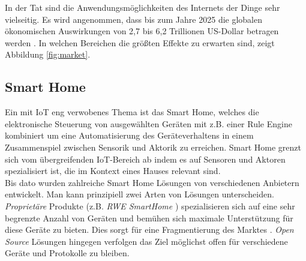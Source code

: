 In der Tat sind die Anwendungsmöglichkeiten des Internets der Dinge sehr vielseitig. Es wird angenommen, dass bis zum Jahre 2025 die globalen ökonomischen Auswirkungen von 2,7 bis 6,2 Trillionen US-Dollar betragen werden \cite{money}. In welchen Bereichen die größten Effekte zu erwarten sind, zeigt Abbildung \ref{fig:market}.





\subsection{Smart Home}
Ein mit IoT eng verwobenes Thema ist das Smart Home\cite{SmartHomeIoT}, welches die elektronische Steuerung von ausgewählten Geräten mit z.B. einer Rule Engine kombiniert um eine Automatisierung des Geräteverhaltens in einem Zusammenspiel zwischen Sensorik und Aktorik zu erreichen. Smart Home grenzt sich vom übergreifenden IoT-Bereich ab indem es auf Sensoren und Aktoren spezialisiert ist, die im Kontext eines Hauses relevant sind.\\

Bis dato wurden zahlreiche Smart Home Lösungen von verschiedenen Anbietern entwickelt. Man kann prinzipiell zwei Arten von Lösungen unterscheiden. \textit{Proprietäre} Produkte (z.B. \textit{RWE SmartHome} \cite{RWE}) spezialisieren sich auf eine sehr begrenzte Anzahl von Geräten und bemühen sich maximale Unterstützung für diese Geräte zu bieten. Dies sorgt für eine Fragmentierung des Marktes \cite{sh:fragment}. \textit{Open Source} Lösungen hingegen verfolgen das Ziel möglichst offen für verschiedene Geräte und Protokolle zu bleiben.\\ 

